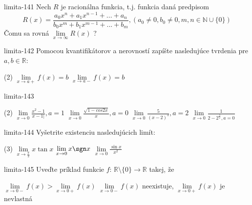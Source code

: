 \begin{defproblem}{limita-141}
Nech $R$ je racionálna funkcia, t.j. funkcia daná predpisom
\[
    R(x)=
        \frac{
            a_0x^n + a_1x^{n-1} + ... + a_n
        }{
            b_0x^m+b_1x^{m-1}+...+b_m
        },
    (a_0 \neq 0, b_0 \neq 0, m, n \in \mathbb{N} \cup \{ 0\})
\]
Čomu sa rovná $\lim\limits_{x \rightarrow \infty} R(x)$ ?
\end{defproblem}

\begin{defproblem}{limita-142}
Pomocou kvantifikátorov a nerovností zapíšte nasledujúce tvrdenia pre $a,b \in
\mathbb{R}$:
\begin{tasks}(2)
\task $\lim\limits_{x \rightarrow a+} f(x)=b$
\task $\lim\limits_{x \rightarrow a-} f(x)=b$
\end{tasks}
\end{defproblem}

\begin{defproblem}{limita-143}
\begin{tasks}(2)
    \task $\lim\limits_{{x \rightarrow 0}} \frac{x^2-1}{x-1|},a=1$
    \task $\lim\limits_{{x \rightarrow 0}} \frac{\sqrt{1-cos 2x}}{x},a=0$
    \task $\lim\limits_{{x \rightarrow 0}} \frac{5}{(x-2)^3},a=2$
    \task $\lim\limits_{{x \rightarrow 0}} \frac{1}{2-2^{\frac{1}{x}},a=0}$
\end{tasks}
\end{defproblem}

\begin{defproblem}{limita-144}
Vyšetrite existenciu nasledujúcich limít:
\begin{tasks}(3)
\task $\lim\limits_{x \rightarrow \frac{\pi}{2}} x \tan x$
\task $\lim\limits_{x \rightarrow 0} x \sgn x$
\task $\lim\limits_{x \rightarrow 0} \frac{\sin x}{x^2}$
\end{tasks}
\end{defproblem}

\begin{defproblem}{limita-145}
Uveďte príklad funkcie $f$: $\mathbb{R} \setminus \{ 0\} \rightarrow \mathbb{R}$ takej, že
\begin{tasks}
\task $\lim\limits_{x \rightarrow 0-} f(x)>\lim\limits_{x \rightarrow 0+} f(x)$
\task $\lim\limits_{x \rightarrow 0-} f(x)$ neexistuje, $\lim\limits_{x \rightarrow 0+} f(x)$ je nevlastná
\end{tasks}
\end{defproblem}

